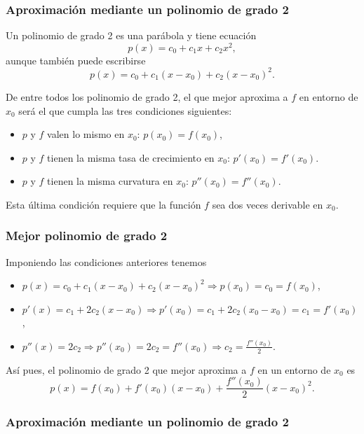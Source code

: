 \begin{frame}
	\frametitle{Aproximación mediante un polinomio de grado 2}
	Un polinomio de grado 2 es una parábola y tiene ecuación
	\[
		p(x) = c_0+c_1x+c_2x^2,
	\]
	aunque también puede escribirse
	\[
		p(x) = c_0+c_1(x-x_0)+c_2(x-x_0)^2.
	\]
	
	De entre todos los polinomio de grado 2, el que mejor aproxima a $f$ en entorno de $x_0$ será el que cumpla las tres condiciones siguientes:
	\begin{itemize}
		\item[\structure{1-}] $p$ y $f$ valen lo mismo en $x_0$: $p(x_0) = f(x_0)$,
		\item[\structure{2-}] $p$ y $f$ tienen la misma tasa de crecimiento en $x_0$: $p'(x_0) = f'(x_0)$.
		\item[\structure{3-}] $p$ y $f$ tienen la misma curvatura en $x_0$: $p''(x_0)=f''(x_0)$.
	\end{itemize}
	Esta última condición requiere que la función $f$ sea dos veces derivable en $x_0$.
\end{frame}


\begin{frame}
	\frametitle{Mejor polinomio de grado 2}
	Imponiendo las condiciones anteriores tenemos
	\begin{itemize}
		\item[\structure{1-}] $p(x)=c_0+c_1(x-x_0)+c_2(x-x_0)^2 \Rightarrow p(x_0)=c_0=f(x_0)$,
		\item[\structure{2-}] $p'(x)=c_1+2c_2(x-x_0) \Rightarrow p'(x_0)=c_1+2c_2(x_0-x_0)=c_1=f'(x_0)$,
		\item[\structure{3-}] $p''(x)=2c_2 \Rightarrow p''(x_0)=2c_2=f''(x_0) \Rightarrow c_2=\frac{f''(x_0)}{2}$.
	\end{itemize}
	
	Así pues, el polinomio de grado 2 que mejor aproxima a $f$ en un entorno de $x_0$ es
	\[
		p(x) = f(x_0)+f'(x_0)(x-x_0)+\frac{f''(x_0)}{2}(x-x_0)^2.
	\]
\end{frame}


\begin{frame}
	\frametitle{Aproximación mediante un polinomio de grado 2}
	\begin{center}
		\scalebox{1}{}
	\end{center}
\end{frame}


